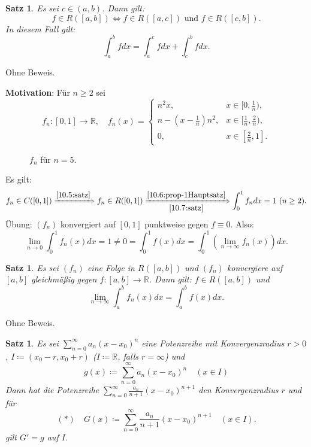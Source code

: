 \documentclass[12pt]{extreport} %
\newcommand{\R}{\mathbb{R}}
\theoremstyle{named}
\theoremstyle{itshape}
\newtheorem{satz}[unnamedtheorem]{Satz}
\theoremstyle{normal}
\begin{document}
{\begin{satz} \label{10.7:satz}
	Es sei $c \in (a, b)$. Dann gilt:
	$$  f \in R([a, b]) \iff f \in R([a, c]) \text{ und } f \in R([c, b]). $$	
	In diesem Fall gilt: $$ \int_{a}^{b} f dx = \int_{a}^{c} f dx + \int_{c}^{b} f dx.$$ 
\end{satz}

Ohne Beweis.

\textbf{Motivation}: Für $n \geq 2$ sei 
	$$f_{n} \colon [0, 1] \rightarrow \R,  \quad f_{n}(x) = \begin{cases} n^{2} x, & x \in [0, \frac{1}{n}), \\ n - (x - \frac{1}{n}) n^{2}, & x \in [\frac{1}{n}, \frac{2}{n}), \\ 
	0, & x \in [\frac{2}{n}, 1]. \end{cases} $$


\begin{figure*}[!ht] \centering
	\caption{$f_{n}$ für $n = 5$.}	
\end{figure*}

Es gilt: $$f_{n} \in C([0, 1]) \xRightarrow[]{\ref{10.5:satz}} f_{n} \in R([0, 1]) \xRightarrow[\ref{10.7:satz}]{\ref{10.6:prop-1Hauptsatz}} \int_{0}^{1} f_{n} dx = 1 ~(n \geq 2).$$
Übung: $(f_{n})$ konvergiert auf $[0, 1]$ punktweise gegen $f \equiv 0$. Also: 
	$$ \lim_{n \rightarrow 0} \int_{0}^{1} f_{n}(x) dx = 1 \neq 0 = \int_{0}^{1} f(x) dx = \int_{0}^{1} \left( \lim_{n \rightarrow \infty} f_{n}(x) \right) dx. $$

\begin{satz} \label{10.8:satz}
	Es sei $(f_{n})$ eine Folge in $R([a, b])$ und $(f_{n})$ konvergiere auf $[a, b]$ gleichmä{\ss}ig gegen $f \colon [a, b] \rightarrow \R$. Dann gilt: $f \in R([a, b])$ und
	$$ \lim_{n \rightarrow \infty} \int_{a}^{b} f_{n}(x) dx = \int_{a}^{b} f(x) dx. $$
\end{satz}

Ohne Beweis.

\begin{satz} \label{10.9:satz}
	Es sei $\sum_{n=0}^{\infty} a_{n} (x - x_{0})^{n}$ eine Potenzreihe mit Konvergenzradius $r > 0$, $I \coloneqq (x_{0} - r, x_{0} + r)$ ($I \coloneqq \R$, falls $r = \infty$) 
	und
	$$ g(x) \coloneqq \sum_{n=0}^{\infty} a_{n} (x - x_{0})^{n} \quad (x \in I) $$
	Dann hat die Potenzreihe $\sum_{n=0}^{\infty} \frac{a_{n}}{n + 1} (x - x_{0})^{n+1}$ den Konvergenzradius $r$ und für
	$$
	(\ast) \quad G(x) \coloneqq \sum_{n=0}^{\infty} \frac{a_{n}}{n + 1} (x - x_{0})^{n+1} \quad (x \in I). 
	$$
	gilt $G' = g$ auf $I$.
\end{satz}

}
\end{document}
